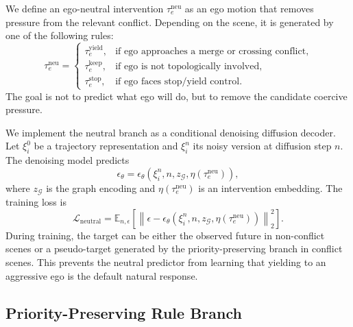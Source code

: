\documentclass[10pt]{article}
\begin{document}
We define an ego-neutral intervention $\tau^{\mathrm{neu}}_e$ as an ego motion that removes pressure from the relevant conflict. Depending on the scene, it is generated by one of the following rules:
\begin{equation}
    \tau^{\mathrm{neu}}_e
    =
    \begin{cases}
        \tau^{\mathrm{yield}}_e, & \text{if ego approaches a merge or crossing conflict},\\
        \tau^{\mathrm{keep}}_e, & \text{if ego is not topologically involved},\\
        \tau^{\mathrm{stop}}_e, & \text{if ego faces stop/yield control}.
    \end{cases}
\end{equation}
The goal is not to predict what ego will do, but to remove the candidate coercive pressure.

We implement the neutral branch as a conditional denoising diffusion decoder. Let $\xi^0_i$ be a trajectory representation and $\xi^n_i$ its noisy version at diffusion step $n$. The denoising model predicts
\begin{equation}
    \epsilon_\theta
    =
    \epsilon_\theta
    \left(
    \xi^n_i,
    n,
    z_{\mathcal{G}},
    \eta(\tau^{\mathrm{neu}}_e)
    \right),
\end{equation}
where $z_{\mathcal{G}}$ is the graph encoding and $\eta(\tau^{\mathrm{neu}}_e)$ is an intervention embedding. The training loss is
\begin{equation}
    \mathcal{L}_{\mathrm{neutral}}
    =
    \mathbb{E}_{n,\epsilon}
    \left[
    \left\|
    \epsilon
    -
    \epsilon_\theta(\xi^n_i,n,z_{\mathcal{G}},\eta(\tau^{\mathrm{neu}}_e))
    \right\|_2^2
    \right].
\end{equation}
During training, the target can be either the observed future in non-conflict scenes or a pseudo-target generated by the priority-preserving branch in conflict scenes. This prevents the neutral predictor from learning that yielding to an aggressive ego is the default natural response.

\subsection{Priority-Preserving Rule Branch}
\label{app:priority_branch}
\end{document}
